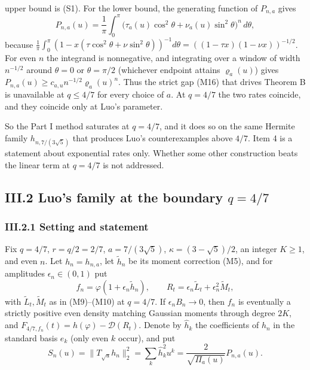 \documentclass[
  british,
  10pt,
]{article}
\begin{document}
\begin{enumerate}
  upper bound is (S1). For the lower bound, the generating function of
  \(P_{n,a}\) gives \[
  P_{n,a}(u)=\frac1\pi\int_0^\pi\bigl(\tau_a(u)\cos^2\theta+\nu_a(u)\sin^2\theta\bigr)^n\,d\theta ,
  \] because
  \(\frac1\pi\int_0^\pi(1-x(\tau\cos^2\theta+\nu\sin^2\theta))^{-1}d\theta=((1-\tau x)(1-\nu x))^{-1/2}\).
  For even \(n\) the integrand is nonnegative, and integrating over a
  window of width \(n^{-1/2}\) around \(\theta=0\) or \(\theta=\pi/2\)
  (whichever endpoint attains \(\varrho_a(u)\)) gives
  \(P_{n,a}(u)\ge c_{a,u}n^{-1/2}\varrho_a(u)^n\). Thus the strict gap
  (M16) that drives Theorem B is unavailable at \(q\le4/7\) for every
  choice of \(a\). At \(q=4/7\) the two rates coincide, and they
  coincide only at Luo's parameter.
\end{enumerate}

So the Part I method saturates at \(q=4/7\), and it does so on the same
Hermite family \(h_{n,7/(3\sqrt5)}\) that produces Luo's counterexamples
above \(4/7\). Item 4 is a statement about exponential rates only.
Whether some other construction beats the linear term at \(q=4/7\) is
not addressed.

\subsection{\texorpdfstring{III.2 Luo's family at the boundary
\(q=4/7\)}{III.2 Luo's family at the boundary q=4/7}}\label{iii.2-luos-family-at-the-boundary-q47}

\subsubsection{III.2.1 Setting and
statement}\label{iii.2.1-setting-and-statement}

Fix \(q=4/7\), \(r=q/2=2/7\), \(a=7/(3\sqrt5)\),
\(\kappa=(3-\sqrt5)/2\), an integer \(K\ge1\), and even \(n\). Let
\(h_n=h_{n,a}\), let \(\widetilde h_n\) be its moment correction (M5),
and for amplitudes \(\epsilon_n\in(0,1)\) put \[
f_n=\varphi(1+\epsilon_n\widetilde h_n),\qquad
R_t=\epsilon_n\widetilde L_t+\epsilon_n^2\widetilde M_t,
\tag{E1}
\] with \(\widetilde L_t,\widetilde M_t\) as in (M9)--(M10) at
\(q=4/7\). If \(\epsilon_nB_n\to0\), then \(f_n\) is eventually a
strictly positive even density matching Gaussian moments through degree
\(2K\), and \(F_{4/7,f_n}(t)=h(\varphi)-\mathcal D(R_t)\). Denote by
\(\hat h_k\) the coefficients of \(h_n\) in the standard basis \(e_k\)
(only even \(k\) occur), and put \[
S_n(u)=\|T_{\sqrt u}h_n\|_2^2=\sum_k\hat h_k^2u^k=\frac{2}{\sqrt{\Pi_a(u)}}P_{n,a}(u).
\]
\end{document}
